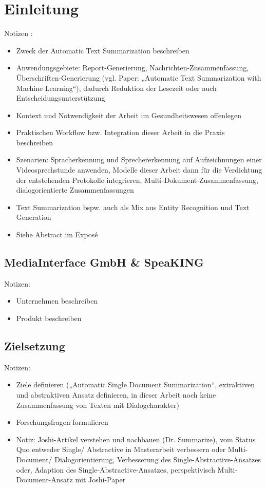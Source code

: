 \chapter{Einleitung}
\thispagestyle{fancy}
\label{chap:Einleitung}

Notizen \cite{BAC15}:
\begin{itemize}
	\item Zweck der Automatic Text Summarization beschreiben
	\item Anwendungsgebiete: Report-Generierung, Nachrichten-Zusammenfassung, Überschriften-Generierung (vgl. Paper: „Automatic Text Summarization with Machine Learning“), dadurch Reduktion der Lesezeit oder auch Entscheidungsunterstützung
	\item Kontext und Notwendigkeit der Arbeit im Gesundheitswesen offenlegen
	\item Praktischen Workflow bzw. Integration dieser Arbeit in die Praxis beschreiben
	\item Szenarien: Spracherkennung und Sprechererkennung auf Aufzeichnungen einer Videosprechstunde anwenden, Modelle dieser Arbeit dann für die Verdichtung der entstehenden Protokolle integrieren, Multi-Dokument-Zusammenfassung, dialogorientierte Zusammenfassungen
	\item Text Summarization bspw. auch als Mix aus Entity Recognition und Text Generation
	\item Siehe Abstract im Exposé
\end{itemize}


\section{MediaInterface GmbH \& SpeaKING\textsuperscript{\textregistered}}
Notizen:
\begin{itemize}
	\item Unternehmen beschreiben
	\item Produkt beschreiben
\end{itemize}


\section{Zielsetzung}
Notizen:
\begin{itemize}
	\item Ziele definieren („Automatic Single Document Summarization“, extraktiven und abstraktiven Ansatz definieren, in dieser Arbeit noch keine Zusammenfassung von Texten mit Dialogcharakter)
	\item Forschungsfragen formulieren
	\item Notiz: Joshi-Artikel verstehen und nachbauen (Dr. Summarize), vom Status Quo entweder Single/ Abstractive in Masterarbeit verbessern oder Multi-Document/ Dialogorientierung, Verbesserung des Single-Abstractive-Ansatzes oder, Adaption des Single-Abstractive-Ansatzes, perspektivisch Multi-Document-Ansatz mit Joshi-Paper
\end{itemize}


